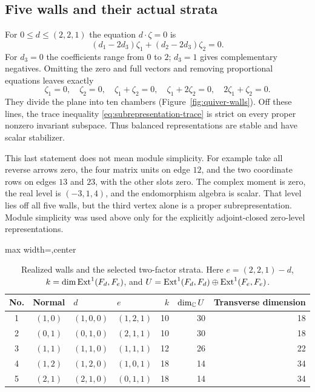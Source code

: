 \subsection{Five walls and their actual strata}
For $0\le d\le(2,2,1)$ the equation $d\cdot\zeta=0$ is
\[
 (d_1-2d_3)\zeta_1+(d_2-2d_3)\zeta_2=0.
\]
For $d_3=0$ the coefficients range from $0$ to $2$; $d_3=1$
gives complementary negatives. Omitting the zero and full vectors
and removing proportional equations leaves exactly
\begin{equation}\label{eq:five-walls}
 \zeta_1=0,\quad\zeta_2=0,\quad\zeta_1+\zeta_2=0,\quad
 \zeta_1+2\zeta_2=0,\quad2\zeta_1+\zeta_2=0.
\end{equation}
They divide the plane into ten chambers
(Figure~\ref{fig:quiver-walls}).
Off these lines, the trace inequality
\eqref{eq:subrepresentation-trace} is strict on every proper
nonzero invariant subspace. Thus balanced representations are
stable and have scalar stabilizer.

This last statement does not mean module simplicity.
For example take all reverse arrows zero, the four matrix units
on edge $12$, and the two coordinate rows on edges $13$ and $23$,
with the other slots zero. The complex moment is zero, the real
level is $(-3,1,4)$, and the endomorphism algebra is scalar.
That level lies off all five walls, but the third vertex alone
is a proper subrepresentation. Module simplicity was used above
only for the explicitly adjoint-closed zero-level representations.

\begin{table}[htbp]
\centering
\caption{Realized walls and the selected two-factor strata.
Here $e=(2,2,1)-d$, $k=\dim\operatorname{Ext}^1(F_d,F_e)$, and
$U=\operatorname{Ext}^1(F_d,F_d)\oplus\operatorname{Ext}^1(F_e,F_e)$.}
\label{tab:walls}
\begin{adjustbox}{max width=\textwidth,center}
\begin{tabular}{ccllrrr}
\toprule
No.&Normal&$d$&$e$&$k$&$\dim_\mathbb C U$&Transverse dimension\\
\midrule
1&$(1,0)$&$(1,0,0)$&$(1,2,1)$&10&30&18\\
2&$(0,1)$&$(0,1,0)$&$(2,1,1)$&10&30&18\\
3&$(1,1)$&$(1,1,0)$&$(1,1,1)$&12&26&22\\
4&$(1,2)$&$(1,2,0)$&$(1,0,1)$&18&14&34\\
5&$(2,1)$&$(2,1,0)$&$(0,1,1)$&18&14&34\\
\bottomrule
\end{tabular}
\end{adjustbox}
\end{table}



